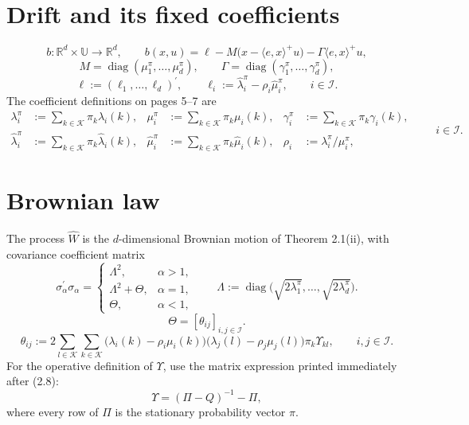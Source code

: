 \documentclass{article}
\begin{document}
\section*{Drift and its fixed coefficients}
\[
b:\mathbb R^d\times\mathbb U\longrightarrow\mathbb R^d,
\qquad
b(x,u)=\ell-M\bigl(x-\langle e,x\rangle^+u\bigr)-\Gamma\langle e,x\rangle^+u,
\]
\[
M=\operatorname{diag}(\mu_1^\pi,\ldots,\mu_d^\pi),
\qquad
\Gamma=\operatorname{diag}(\gamma_1^\pi,\ldots,\gamma_d^\pi),
\]
\[
\ell:=(\ell_1,\ldots,\ell_d)^\prime,
\qquad
\ell_i:=\hat\lambda_i^\pi-\rho_i\hat\mu_i^\pi,
\qquad i\in\mathcal I.
\]
The coefficient definitions on pages 5--7 are
\[
\begin{aligned}
\lambda_i^\pi&:=\sum_{k\in\mathcal K}\pi_k\lambda_i(k),&
\mu_i^\pi&:=\sum_{k\in\mathcal K}\pi_k\mu_i(k),&
\gamma_i^\pi&:=\sum_{k\in\mathcal K}\pi_k\gamma_i(k),\\
\hat\lambda_i^\pi&:=\sum_{k\in\mathcal K}\pi_k\hat\lambda_i(k),&
\hat\mu_i^\pi&:=\sum_{k\in\mathcal K}\pi_k\hat\mu_i(k),&
\rho_i&:=\lambda_i^\pi/\mu_i^\pi,
\end{aligned}
\qquad i\in\mathcal I.
\]

\section*{Brownian law}
The process \(\hat W\) is the \(d\)-dimensional Brownian motion of Theorem 2.1(ii), with covariance coefficient matrix
\[
\sigma_\alpha^\prime\sigma_\alpha=
\begin{cases}
\Lambda^2,&\alpha>1,\\
\Lambda^2+\Theta,&\alpha=1,\\
\Theta,&\alpha<1,
\end{cases}
\qquad
\Lambda:=\operatorname{diag}\bigl(\sqrt{2\lambda_1^\pi},\ldots,\sqrt{2\lambda_d^\pi}\bigr).
\]
\[
\Theta=[\theta_{ij}]_{i,j\in\mathcal I}.
\]
\begin{equation}
\theta_{ij}:=2\sum_{l\in\mathcal K}\sum_{k\in\mathcal K}
\bigl(\lambda_i(k)-\rho_i\mu_i(k)\bigr)
\bigl(\lambda_j(l)-\rho_j\mu_j(l)\bigr)
\pi_k\Upsilon_{kl},\qquad i,j\in\mathcal I.
\tag{2.8}
\end{equation}
For the operative definition of \(\Upsilon\), use the matrix expression printed immediately after (2.8):
\[
\Upsilon=(\Pi-Q)^{-1}-\Pi,
\]
where every row of \(\Pi\) is the stationary probability vector \(\pi\).
\end{document}
